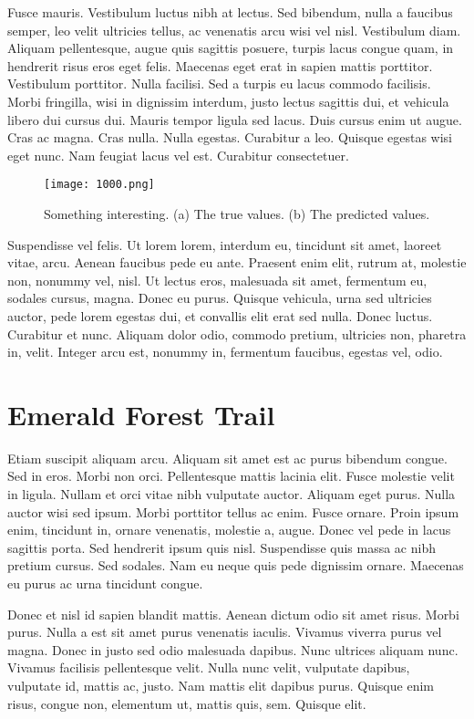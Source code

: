 Fusce mauris. Vestibulum luctus nibh at lectus. Sed bibendum, nulla a faucibus
semper, leo velit ultricies tellus, ac venenatis arcu wisi vel nisl. Vestibulum
diam. Aliquam pellentesque, augue quis sagittis posuere, turpis lacus congue
quam, in hendrerit risus eros eget felis. Maecenas eget erat in sapien mattis
porttitor. Vestibulum porttitor. Nulla facilisi. Sed a turpis eu lacus commodo
facilisis. Morbi fringilla, wisi in dignissim interdum, justo lectus sagittis dui, et
vehicula libero dui cursus dui. Mauris tempor ligula sed lacus. Duis cursus enim
ut augue. Cras ac magna. Cras nulla. Nulla egestas. Curabitur a leo. Quisque
egestas wisi eget nunc. Nam feugiat lacus vel est. Curabitur consectetuer.
\begin{figure}[htb]
  \centering
  \texttt{[image: 1000.png]}
  \caption{Something interesting. (a) The true values. (b) The predicted values.}
\end{figure}

Suspendisse vel felis. Ut lorem lorem, interdum eu, tincidunt sit amet, laoreet
vitae, arcu. Aenean faucibus pede eu ante. Praesent enim elit, rutrum at,
molestie non, nonummy vel, nisl. Ut lectus eros, malesuada sit amet, fermentum
eu, sodales cursus, magna. Donec eu purus. Quisque vehicula, urna sed ultricies
auctor, pede lorem egestas dui, et convallis elit erat sed nulla. Donec luctus.
Curabitur et nunc. Aliquam dolor odio, commodo pretium, ultricies non,
pharetra in, velit. Integer arcu est, nonummy in, fermentum faucibus, egestas
vel, odio.

\section{Emerald Forest Trail}
Etiam suscipit aliquam arcu. Aliquam sit amet est ac purus bibendum congue.
Sed in eros. Morbi non orci. Pellentesque mattis lacinia elit. Fusce molestie
velit in ligula. Nullam et orci vitae nibh vulputate auctor. Aliquam eget purus.
Nulla auctor wisi sed ipsum. Morbi porttitor tellus ac enim. Fusce ornare.
Proin ipsum enim, tincidunt in, ornare venenatis, molestie a, augue. Donec vel
pede in lacus sagittis porta. Sed hendrerit ipsum quis nisl. Suspendisse quis
massa ac nibh pretium cursus. Sed sodales. Nam eu neque quis pede dignissim
ornare. Maecenas eu purus ac urna tincidunt congue.

\widerule[black]

Donec et nisl id sapien blandit mattis. Aenean dictum odio sit amet risus.
Morbi purus. Nulla a est sit amet purus venenatis iaculis. Vivamus viverra
purus vel magna. Donec in justo sed odio malesuada dapibus. Nunc ultrices
aliquam nunc. Vivamus facilisis pellentesque velit. Nulla nunc velit, vulputate
dapibus, vulputate id, mattis ac, justo. Nam mattis elit dapibus purus. Quisque
enim risus, congue non, elementum ut, mattis quis, sem. Quisque elit.

